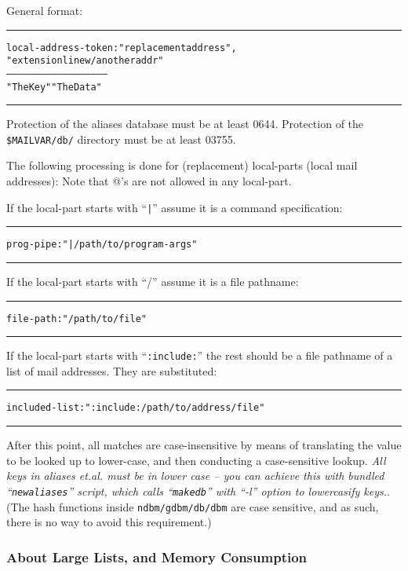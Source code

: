 General format:

\begin{alltt}\medskip\hrule\medskip
 local-address-token:    "replacement address" ,
                         "extension line w/ another addr"
 --------------------    --------------------------------
     "The Key"                "The Data"
\medskip\hrule\end{alltt}\medskip

Protection of the aliases database must be at least 0644.
Protection of the {\tt \$MAILVAR/db/} directory must be at least 03755.



The following processing is done for (replacement) local-parts
(local mail addresses):  Note that @'s are not allowed in any local-part.



If the local-part starts with ``\verb/|/'' assume it is a command
specification:
\begin{alltt}\medskip\hrule\medskip
prog-pipe: "|/path/to/program -args"
\medskip\hrule\end{alltt}\medskip

If the local-part starts with ``/'' assume it is a file pathname:
\begin{alltt}\medskip\hrule\medskip
file-path: "/path/to/file"
\medskip\hrule\end{alltt}\medskip

If the local-part starts with ``{\tt :include:}'' the rest should be a file
pathname of a list of mail addresses.  They are substituted:
\begin{alltt}\medskip\hrule\medskip
included-list: ":include:/path/to/address/file"
\medskip\hrule\end{alltt}\medskip


After this point, all matches are case-insensitive by means of translating
the value to be looked up to lower-case, and then conducting a case-sensitive
lookup. {\em All keys in aliases et.al. must be in lower case -- you
can achieve this with bundled ``{\tt newaliases}'' script, which calls
``{\tt makedb}'' with ``-l'' option to lowercasify keys.}.
(The hash functions inside  {\tt ndbm/gdbm/db/dbm}  are case sensitive, and 
as such, there is no way to avoid this requirement.)


\subsubsection{About Large Lists, and Memory Consumption}

